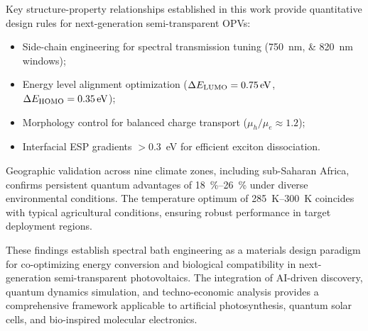 Key structure-property relationships established in this work provide quantitative design rules for next-generation semi-transparent OPVs:
\begin{itemize}
    \item Side-chain engineering for spectral transmission tuning (\SIlist{750;820}{\nano\meter} windows);
    \item Energy level alignment optimization ($\Delta E_{\rm LUMO} = \SI{0.75}{\electronvolt}$, $\Delta E_{\rm HOMO} = \SI{0.35}{\electronvolt}$);
    \item Morphology control for balanced charge transport ($\mu_h/\mu_e \approx \num{1.2}$);
    \item Interfacial ESP gradients $>$\SI{0.3}{\electronvolt} for efficient exciton dissociation.
\end{itemize}

Geographic validation across nine climate zones, including sub-Saharan Africa, confirms persistent quantum advantages of \SIrange{18}{26}{\percent} under diverse environmental conditions. The temperature optimum of \SIrange{285}{300}{\kelvin} coincides with typical agricultural conditions, ensuring robust performance in target deployment regions.

These findings establish spectral bath engineering as a materials design paradigm for co-optimizing energy conversion and biological compatibility in next-generation semi-transparent photovoltaics. The integration of AI-driven discovery, quantum dynamics simulation, and techno-economic analysis provides a comprehensive framework applicable to artificial photosynthesis, quantum solar cells, and bio-inspired molecular electronics.
